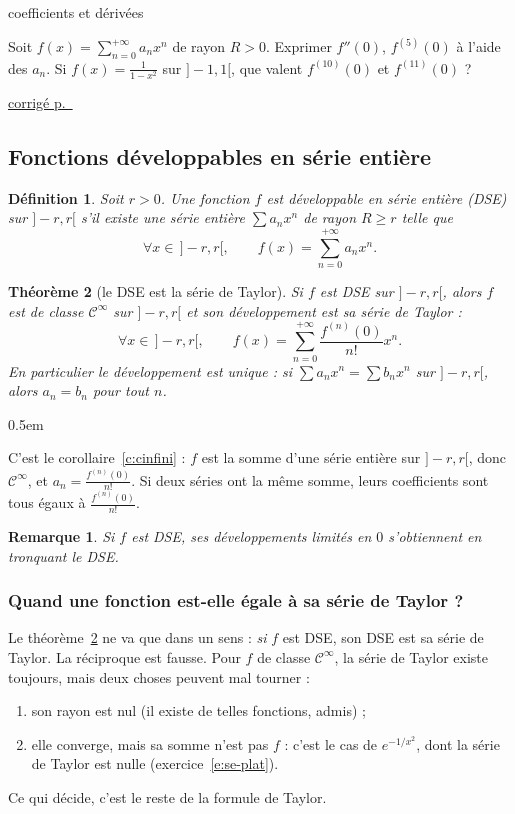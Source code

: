\documentclass[a4paper,11pt]{article}
\makeatletter
\numberwithin{equation}{section}
\numberwithin{figure}{section}
\numberwithin{table}{section}
\theoremstyle{enonce}
\newtheorem{definition}{Définition}[section]
\newtheorem{theoreme}[definition]{Théorème}
\theoremstyle{exemple}
\theoremstyle{remarque}
\newtheorem*{remarque}{Remarque}
\renewcommand{\proofname}{Démonstration}
\renewenvironment{proof}[1][\proofname]{\par\pushQED{\qed}\normalfont
  \topsep0.5em\relax\trivlist\item[\hskip\labelsep\sffamily\itshape\color{Gris}#1.]\ignorespaces}
  {\popQED\endtrivlist\@endpefalse}
\newcounter{exo}[section]
\renewcommand{\theexo}{\thesection.\arabic{exo}}
\newcommand{\niveau}[1]{{\color{Ocre}\footnotesize
  \ifcase#1\or$\bullet\circ\circ\circ\circ$\or$\bullet\bullet\circ\circ\circ$\or$\bullet\bullet\bullet\circ\circ$%
  \or$\bullet\bullet\bullet\bullet\circ$\or$\bullet\bullet\bullet\bullet\bullet$\fi}}
\newenvironment{exo}[3]{%
  \par\needspace{5\baselineskip}\vspace{0.75em}\refstepcounter{exo}\label{e:#1}%
  \def\exolab{#1}%
  \noindent{\sffamily\bfseries\color{Bleu}Exercice~\theexo}\quad\niveau{#2}%
  \hfill{\footnotesize\sffamily\color{Gris}#3}\par\nobreak\vspace{0.15em}}%
  {\par\nopagebreak\noindent\hfill{\scriptsize\sffamily\hyperref[c:\exolab]{\color{Gris}corrigé p.~\pageref{c:\exolab}}}\par}
\makeatother
\begin{document}
\begin{exo}{se-coef}{2}{coefficients et dérivées}
Soit $f(x)=\sum_{n=0}^{+\infty}a_nx^n$ de rayon $R>0$. Exprimer $f''(0)$, $f^{(5)}(0)$ à l'aide des $a_n$. Si $f(x)=\frac1{1-x^2}$ sur $]-1,1[$,
que valent $f^{(10)}(0)$ et $f^{(11)}(0)$ ?
\end{exo}

\subsection{Fonctions développables en série entière}\label{ss:dse}

\begin{definition}
Soit $r>0$. Une fonction $f$ est \emph{développable en série entière} (DSE) sur $]-r,r[$ s'il existe une série entière
$\sum a_nx^n$ de rayon $R\geq r$ telle que
\[\forall x\in\,]-r,r[,\qquad f(x)=\sum_{n=0}^{+\infty}a_nx^n.\]
\end{definition}

\begin{theoreme}[le DSE est la série de Taylor]\label{t:dseTaylor}
Si $f$ est DSE sur $]-r,r[$, alors $f$ est de classe $\mathcal C^\infty$ sur $]-r,r[$ et son développement est sa série de Taylor :
\[\forall x\in\,]-r,r[,\qquad f(x)=\sum_{n=0}^{+\infty}\frac{f^{(n)}(0)}{n!}x^n.\]
En particulier le développement est \emph{unique} : si $\sum a_nx^n=\sum b_nx^n$ sur $]-r,r[$, alors $a_n=b_n$ pour tout $n$.
\end{theoreme}

\begin{proof}
C'est le corollaire~\ref{c:cinfini} : $f$ est la somme d'une série entière sur $]-r,r[$, donc $\mathcal C^\infty$, et $a_n=\frac{f^{(n)}(0)}{n!}$.
Si deux séries ont la même somme, leurs coefficients sont tous égaux à $\frac{f^{(n)}(0)}{n!}$.
\end{proof}

\begin{remarque}
Si $f$ est DSE, ses développements limités en $0$ s'obtiennent en tronquant le DSE.
\end{remarque}

\subsubsection*{Quand une fonction est-elle égale à sa série de Taylor ?}

Le théorème~\ref{t:dseTaylor} ne va que dans un sens : \emph{si} $f$ est DSE, son DSE est sa série de Taylor. La réciproque est
fausse. Pour $f$ de classe $\mathcal C^\infty$, la série de Taylor existe toujours, mais deux choses peuvent mal tourner :
\begin{enumerate}
\item son rayon est nul (il existe de telles fonctions, admis) ;
\item elle converge, mais sa somme n'est pas $f$ : c'est le cas de $e^{-1/x^2}$, dont la série de Taylor est nulle
      (exercice~\ref{e:se-plat}).
\end{enumerate}
Ce qui décide, c'est le reste de la formule de Taylor.
\end{document}
